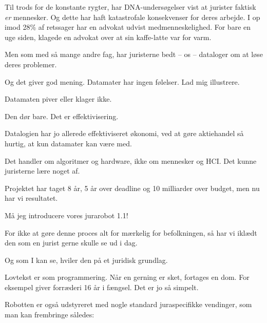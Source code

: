 \documentclass[a4paper,11pt]{article}
\begin{document}
\begin{sketch}


 Til trods for de konstante rygter, har DNA-undersøgelser vist at
jurister faktisk \emph{er} mennesker.  Og dette har haft katastrofale
konsekvenser for deres arbejde.  I op imod 28\% af retssager har en
advokat udvist medmenneskelighed.  For bare en uge siden, klagede en
advokat over at sin kaffe-latte var for varm.

 Men som med så mange andre fag, har juristerne bedt -- os -- dataloger om
at løse deres problemer.

 Og det giver god mening.  Datamater har ingen følelser.  Lad mig illustrere.


 Datamaten piver eller klager ikke.


 Den dør bare.  Det er effektivisering.

 Datalogien har jo allerede effektiviseret økonomi, ved at gøre
aktiehandel så hurtig, at kun datamater kan være med.

 Det handler om algoritmer og hardware, ikke om mennesker og HCI.
Det kunne juristerne lære noget af.

 Projektet har taget 8 år, 5 år over deadline og 10 milliarder
over budget, men nu har vi resultatet.


 Må jeg introducere vores jurarobot 1.1!

 For ikke at gøre denne proces alt for mærkelig for befolkningen, så
har vi iklædt den som en jurist gerne skulle se ud i dag.


 Og som I kan se, hviler den på et juridisk grundlag.

 Lovtekst er som programmering.  Når en gerning er sket, fortages en dom.
For eksempel giver forræderi 16 år i fængsel.  Det er jo så simpelt.

 Robotten er også udstyreret med nogle standard juraspecifikke vendinger,
som man kan frembringe således:


\end{sketch}
\end{document}
